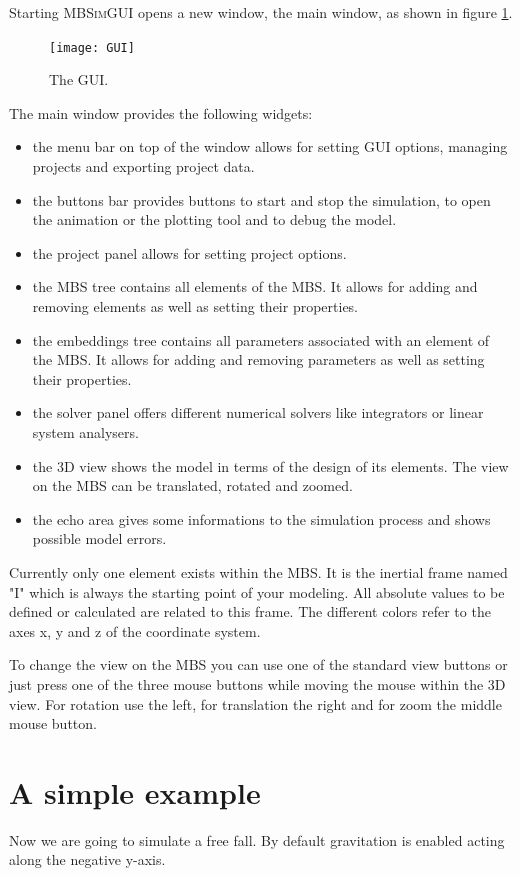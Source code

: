 \documentclass[
a4paper,
fleqn,
DIV=15,
pagesize
]{scrartcl}
\begin{document}
Starting \textsc{MBSimGUI} opens a new window, the main window, as shown in figure \ref{GUI}.
\begin{figure}
\centering
\texttt{[image: GUI]}
\caption{The GUI.} \label{GUI}
\end{figure}
The main window provides the following widgets:
\begin{itemize}
  \item the menu bar on top of the window allows for setting GUI options, managing
  projects and exporting project data.
  \item the buttons bar provides buttons to start and stop the simulation, to open
  the animation or the plotting tool and to debug the model.
  \item the project panel allows for setting project options.
  \item the MBS tree contains all elements of the MBS.
  It allows for adding and removing elements as well as setting their properties.
  \item the embeddings tree contains all parameters associated with an element of
  the MBS. It allows for adding and removing parameters as well as setting their
  properties.
  \item the solver panel offers different numerical solvers like integrators or
  linear system analysers.
  \item the 3D view shows the model in terms of the design of its elements. The
  view on the MBS can be translated, rotated and zoomed.
  \item the echo area gives some informations to the simulation process and shows
  possible model errors.
\end{itemize}

Currently only one element exists within the MBS. It is the inertial frame named
"I" which is always the starting point of your modeling. All absolute values to
be defined or calculated are related to this frame. The different colors refer
to the axes {\color{red} x}, {\color{green} y} and {\color{blue} z} of the
coordinate system.

To change the view on the MBS you can use one of the standard view buttons or
just press one of the three mouse buttons while moving the mouse within the 3D
view. For rotation use the left, for translation the right and for zoom the
middle mouse button.

\section{A simple example}
Now we are going to simulate a free fall. By default gravitation is enabled
acting along the negative {\color{green}y-axis}. 
\end{document}
